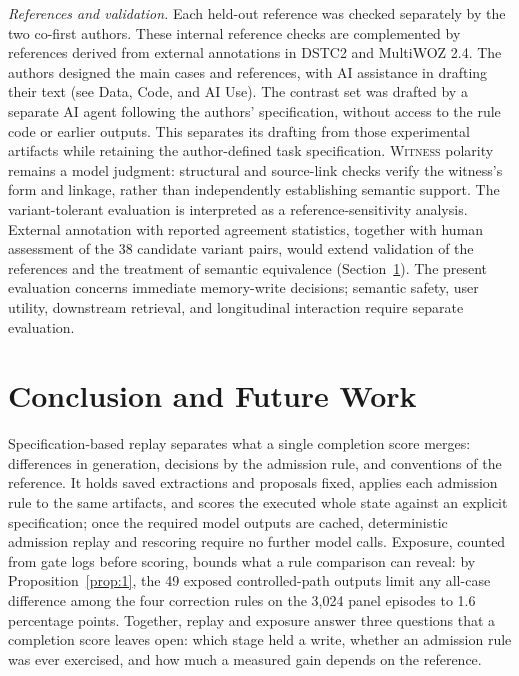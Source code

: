 \documentclass[acmsmall,review,anonymous]{acmart}
\newcommand{\witness}{\textsc{Witness}}
\begin{document}
\emph{References and validation.} Each held-out reference was checked separately by the two co-first authors. These internal reference checks are complemented by references derived from external annotations in DSTC2 and MultiWOZ 2.4. The authors designed the main cases and references, with AI assistance in drafting their text (see Data, Code, and AI Use). The contrast set was drafted by a separate AI agent following the authors' specification, without access to the rule code or earlier outputs. This separates its drafting from those experimental artifacts while retaining the author-defined task specification. \witness{} polarity remains a model judgment: structural and source-link checks verify the witness's form and linkage, rather than independently establishing semantic support. The variant-tolerant evaluation is interpreted as a reference-sensitivity analysis. External annotation with reported agreement statistics, together with human assessment of the 38 candidate variant pairs, would extend validation of the references and the treatment of semantic equivalence (Section~\ref{sec:future work and conclusion}). The present evaluation concerns immediate memory-write decisions; semantic safety, user utility, downstream retrieval, and longitudinal interaction require separate evaluation.

\section{Conclusion and Future Work}\label{sec:future work and conclusion}
Specification-based replay separates what a single completion score merges: differences in generation, decisions by the admission rule, and conventions of the reference. It holds saved extractions and proposals fixed, applies each admission rule to the same artifacts, and scores the executed whole state against an explicit specification; once the required model outputs are cached, deterministic admission replay and rescoring require no further model calls. Exposure, counted from gate logs before scoring, bounds what a rule comparison can reveal: by Proposition~\ref{prop:1}, the 49 exposed controlled-path outputs limit any all-case difference among the four correction rules on the 3,024 panel episodes to 1.6 percentage points. Together, replay and exposure answer three questions that a completion score leaves open: which stage held a write, whether an admission rule was ever exercised, and how much a measured gain depends on the reference.
\end{document}

